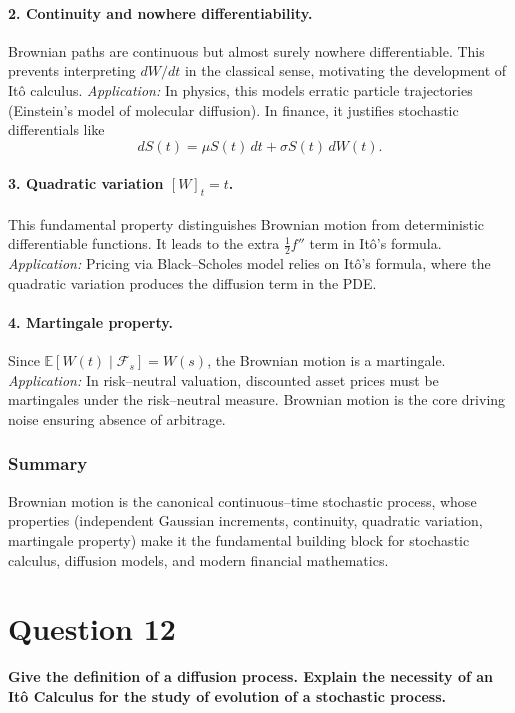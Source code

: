 \documentclass[12pt,a4paper]{book}
\theoremstyle{remark}
\newcommand{\EE}{\mathbb{E}}          %
\newcommand{\F}{\mathcal{F}}          %
\begin{document}
\paragraph{2. Continuity and nowhere differentiability.}
Brownian paths are continuous but almost surely nowhere differentiable. This prevents interpreting $dW/dt$ in the classical sense, motivating the development of Itô calculus.  
\emph{Application:} In physics, this models erratic particle trajectories (Einstein’s model of molecular diffusion). In finance, it justifies stochastic differentials like
\[
dS(t) = \mu S(t)\,dt + \sigma S(t)\,dW(t).
\]

\paragraph{3. Quadratic variation $[W]_t = t$.}
This fundamental property distinguishes Brownian motion from deterministic differentiable functions. It leads to the extra $\tfrac{1}{2}f''$ term in Itô’s formula.  
\emph{Application:} Pricing via Black–Scholes model relies on Itô’s formula, where the quadratic variation produces the diffusion term in the PDE.

\paragraph{4. Martingale property.}
Since $\EE[W(t)\mid\F_s]=W(s)$, the Brownian motion is a martingale.  
\emph{Application:} In risk–neutral valuation, discounted asset prices must be martingales under the risk–neutral measure. Brownian motion is the core driving noise ensuring absence of arbitrage.

\subsubsection*{Summary}
Brownian motion is the canonical continuous–time stochastic process, whose properties (independent Gaussian increments, continuity, quadratic variation, martingale property) make it the fundamental building block for stochastic calculus, diffusion models, and modern financial mathematics.




\newpage
\section{Question 12}
\textbf{Give the definition of a diffusion process. Explain the necessity of an Itô Calculus for the study of evolution of a stochastic process.}
\end{document}
